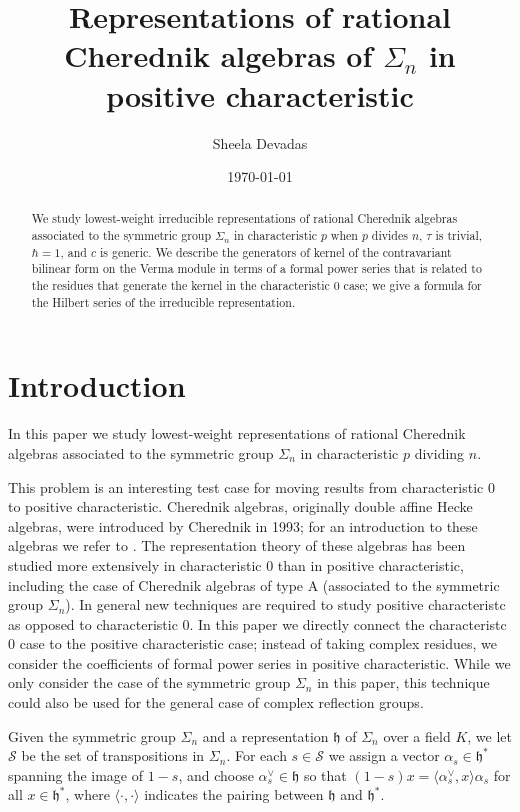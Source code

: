 \documentclass{article}
\title{Representations of rational Cherednik algebras of $\Sigma_n$ in positive characteristic}
\author{Sheela Devadas}
\date{\today}
\numberwithin{equation}{section}
\newcommand{\h}{\mathfrak{h}}
\begin{document}
\maketitle

\begin{abstract}
We study lowest-weight irreducible representations of rational Cherednik algebras associated to the symmetric group $\Sigma_n$ in characteristic $p$ when $p$ divides $n$, $\tau$ is trivial, $\hbar=1$, and $c$ is generic. We describe the generators of kernel of the contravariant bilinear form on the Verma module in terms of a formal power series that is related to the residues that generate the kernel in the characteristic $0$ case; we give a formula for the Hilbert series of the irreducible representation.
\end{abstract}

\section{Introduction}

In this paper we study lowest-weight representations of rational Cherednik algebras associated to the symmetric group $\Sigma_n$ in characteristic $p$ dividing $n$.



This problem is an interesting test case for moving results from characteristic $0$ to positive characteristic. Cherednik algebras, originally double affine Hecke algebras, were introduced by Cherednik in 1993; for an introduction to these algebras we refer to \cite{EM}. The representation theory of these algebras has been studied more extensively in characteristic $0$ than in positive characteristic, including the case of Cherednik algebras of type A (associated to the symmetric group $\Sigma_n$). In general new techniques are required to study positive characteristc as opposed to characteristic 0. In this paper we directly connect the characteristc 0 case to the positive characteristic case; instead of taking complex residues, we consider the coefficients of formal power series in positive characteristic. While we only consider the case of the symmetric group $\Sigma_n$ in this paper, this technique could also be used for the general case of complex reflection groups.


Given the symmetric group $\Sigma_n$ and a representation $\h$ of $\Sigma_n$ over a field $K$, we let $\mathcal{S}$ be the set of transpositions in $\Sigma_n$. For each $s \in \mathcal{S}$ we assign a vector $\alpha_s \in \h^*$ spanning the image of $1-s$, and choose $\alpha_s^\vee \in \h$ so that $(1-s)x=\langle \alpha_s^\vee,x\rangle \alpha_s$ for all $x \in \h^*$, where $\langle \cdot,\cdot\rangle$ indicates the pairing between $\h$ and $\h^*$. 
\end{document}
